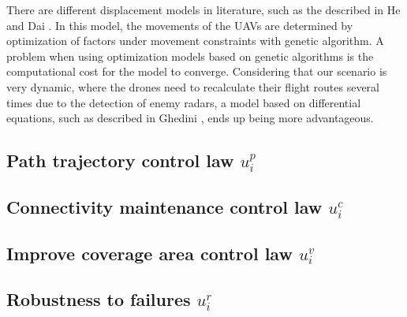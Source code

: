 There are different displacement models in literature, such as the described in He and Dai \cite{he_2013}. In this model, the movements of the UAVs are determined by optimization of factors under movement constraints with genetic algorithm.  A problem when using optimization models based on genetic algorithms is the computational cost for the model to converge. Considering that our scenario is very dynamic, where the drones need to recalculate their flight routes several times due to the detection of enemy radars, a model based on differential equations, such as described in Ghedini \cite{ghedini_2017}, ends up being more advantageous.

\subsection{Path trajectory control law $u_i^p$}


\subsection{Connectivity maintenance control law $u_i^c$}
 \label{sec:connectivity}

\subsection{Improve coverage area control law $u_i^v$}


\subsection{Robustness to failures $u_i^r$}
 \label{sec:robustness}


